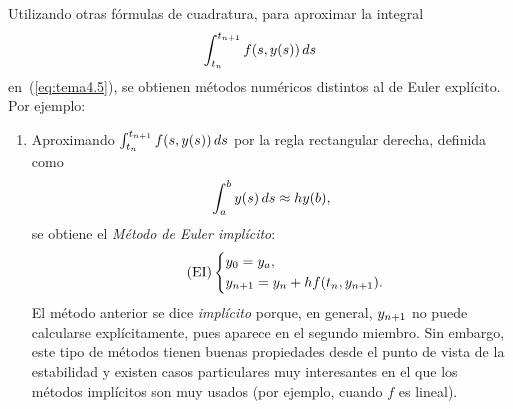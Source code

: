 Utilizando otras fórmulas de cuadratura, para aproximar la integral
$$\int_{t_n}^{t_{n+1}} f(s,y(s))\, ds$$ en~(\ref{eq:tema4.5}),
se obtienen métodos numéricos
distintos al de Euler explícito. Por ejemplo:
\begin{enumerate}
\item Aproximando $\int_{t_n}^{t_{n+1}} f(s,y(s))\, ds$ por la regla
  rectangular derecha, definida como
  \begin{equation*}
    \int_a^b y(s)\,ds \approx hy(b),
  \end{equation*}
  se obtiene el \textit{Método de Euler implícito}:
  \begin{equation}
    \label{eq:euler-implicito}
    \tag{EI}
    \left\{
      \begin{aligned}
        &y_0={y_a},\\ &{y_{n+1}} = {y_n} + h f({t_n},{y_{n+1}}).
      \end{aligned}
    \right.
  \end{equation}
  El método anterior se dice \textit{implícito} porque, en general,
  ${y_{n+1}}$ no puede calcularse explícitamente, pues aparece en el
  segundo miembro. Sin embargo, este tipo de métodos tienen buenas
  propiedades desde el punto de vista de la estabilidad y existen
  casos particulares muy interesantes en el que los métodos implícitos
  son muy usados (por ejemplo, cuando $f$ es lineal).


\end{enumerate}
